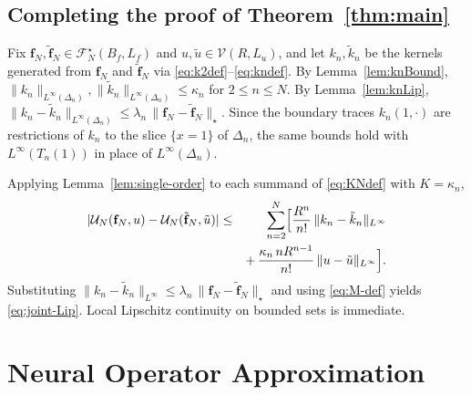 \documentclass[twocolumn,amsthm]{autart}
\newcommand{\Linf}{L^\infty}
\theoremstyle{plain}
\theoremstyle{definition}
\begin{document}
\subsection{Completing the proof of Theorem~\ref{thm:main}}
\label{sec:proof}

Fix $\mathbf{f}_N,\tilde{\mathbf{f}}_N\in\mathcal{F}_N^\star(B_f,L_f)$ and $u,\tilde u\in\mathcal{V}(R,L_u)$, and let $k_n,\tilde k_n$ be the kernels generated from $\mathbf{f}_N$ and $\tilde{\mathbf{f}}_N$ via \eqref{eq:k2def}--\eqref{eq:kndef}. By Lemma~\ref{lem:knBound}, $\|k_n\|_{\Linf(\Delta_n)},\|\tilde k_n\|_{\Linf(\Delta_n)}\le\kappa_n$ for $2\le n\le N$. By Lemma~\ref{lem:knLip}, $\|k_n-\tilde k_n\|_{\Linf(\Delta_n)}\le\lambda_n\,\|\mathbf{f}_N-\tilde{\mathbf{f}}_N\|_\star$. Since the boundary traces $k_n(1,\cdot)$ are restrictions of $k_n$ to the slice $\{x = 1\}$ of $\Delta_n$, the same bounds hold with $\Linf(T_n(1))$ in place of $\Linf(\Delta_n)$.

Applying Lemma~\ref{lem:single-order} to each summand of \eqref{eq:KNdef} with $K=\kappa_n$,
\begin{eqnarray}
|\mathcal{U}_N(\mathbf{f}_N,u) - \mathcal{U}_N(\tilde{\mathbf{f}}_N,\tilde u)| &\le& \sum_{n=2}^N\Bigl[\frac{R^n}{n!}\,\|k_n-\tilde k_n\|_{\Linf} \nonumber \\
&& +\, \frac{\kappa_n\,n R^{n-1}}{n!}\,\|u-\tilde u\|_{\Linf}\Bigr].
\label{eq:UN-diff-bnd}
\end{eqnarray}
Substituting $\|k_n-\tilde k_n\|_{\Linf}\le\lambda_n\,\|\mathbf{f}_N-\tilde{\mathbf{f}}_N\|_\star$ and using \eqref{eq:M-def} yields \eqref{eq:joint-Lip}. Local Lipschitz continuity on bounded sets is immediate.


\section{Neural Operator Approximation}
\label{sec:NO}
\end{document}
